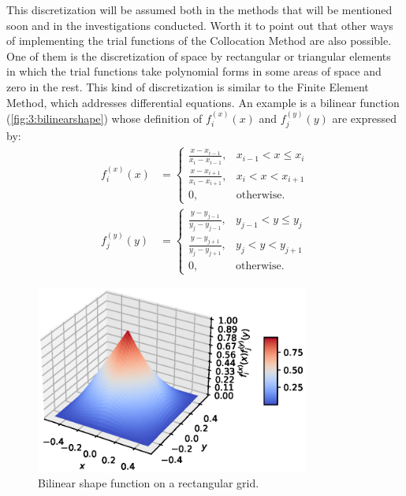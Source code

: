 			This discretization will be assumed both in the methods that will be mentioned soon and in the investigations conducted. Worth it to point out that other ways of implementing the trial functions of the Collocation Method are also possible. One of them is the discretization of space by rectangular or triangular elements in which the trial functions take polynomial forms in some areas of space and zero in the rest. This kind of discretization is similar to the Finite Element Method, which addresses differential equations. An example is a bilinear function (\autoref{fig:3:bilinearshape}) whose definition of $f^{(x)}_i(x)$ and $f^{(y)}_j(y)$ are expressed by:
			\begin{align}
				f^{(x)}_i(x) &= \begin{cases} \frac{x - x_{i-1}}{x_i-x_{i-1}}, & x_{i-1} < x \le x_i \\ \frac{x - x_{i+1}}{x_i-x_{i+1}}, &x_i < x < x_{i+1} \\ 0, &\mathrm{ otherwise.} \end{cases} \label{eq:3:discretization:collocation:19} \\
				f^{(y)}_j(y) &= \begin{cases} \frac{y - y_{j-1}}{y_j-y_{j-1}}, & y_{j-1} < y \le y_j \\ \frac{y - y_{j+1}}{y_j-y_{j+1}}, &y_j < y < y_{j+1}\\ 0, &\mathrm{ otherwise.} \end{cases} \label{eq:3:discretization:collocation:20}
			\end{align}
			\begin{figure}[!htb]
				\centering
				\includegraphics[width=0.8\textwidth]{./figuras/bilinearshape}
				\caption{Bilinear shape function on a rectangular grid.}
				\label{fig:3:bilinearshape}
			\end{figure}
		
